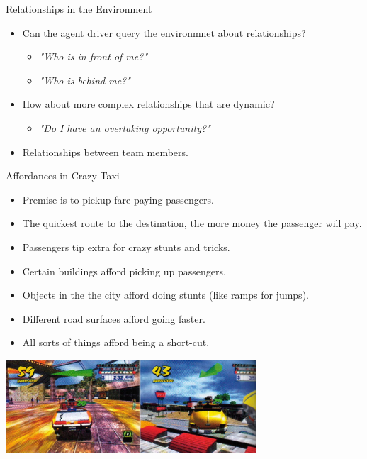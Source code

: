 \documentclass[aspectratio=1610,xcolor=dvipsnames,t]{beamer}
\begin{document}
\begin{frame}{Relationships in the Environment}
    \begin{itemize}
        \item Can the agent driver query the environmnet about 
              relationships?
              \begin{itemize}
                \item \emph{"Who is in front of me?"}
                \item \emph{"Who is behind me?"} 
              \end{itemize}
        \item How about more complex relationships that are dynamic?
            \begin{itemize}
                \item \emph{"Do I have an overtaking opportunity?"}
            \end{itemize}
        \item Relationships between team members.
    \end{itemize}
\end{frame}

\begin{frame}{Affordances in Crazy Taxi} 
    \begin{itemize}
        \item Premise is to pickup fare paying passengers.
        \item The quickest route to the destination, the more
              money the passenger will pay.
        \item Passengers tip extra for crazy stunts and tricks.
        \item Certain buildings afford picking up passengers.
        \item Objects in the the city afford doing stunts 
              (like ramps for jumps).
        \item Different road surfaces afford going faster.
        \item All sorts of things afford being a short-cut.
    \end{itemize}
    \begin{center}
        \includegraphics[width=0.7\textwidth]{crazytaxi} 
    \end{center}
\end{frame} 
\end{document}
